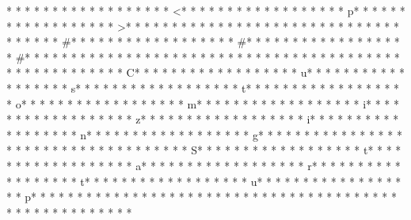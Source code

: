 * * *  * * *  * * *  *  * * *  *  * * *  * <* * *  * * *  * * *  *  * * *  *  * * *  * p* * *  * * *  * * *  *  * * *  *  * * *  * >* * *  * * *  * * *  *  * * *  *  * * *  * 
* * *  * * *  * * *  *  * * *  *  * * *  * #* * *  * * *  * * *  *  * * *  *  * * *  * #* * *  * * *  * * *  *  * * *  *  * * *  * #* * *  * * *  * * *  *  * * *  *  * * *  *  * * *  * * *  * * *  *  * * *  *  * * *  * {* * *  * * *  * * *  *  * * *  *  * * *  * C* * *  * * *  * * *  *  * * *  *  * * *  * u* * *  * * *  * * *  *  * * *  *  * * *  * s* * *  * * *  * * *  *  * * *  *  * * *  * t* * *  * * *  * * *  *  * * *  *  * * *  * o* * *  * * *  * * *  *  * * *  *  * * *  * m* * *  * * *  * * *  *  * * *  *  * * *  * i* * *  * * *  * * *  *  * * *  *  * * *  * z* * *  * * *  * * *  *  * * *  *  * * *  * i* * *  * * *  * * *  *  * * *  *  * * *  * n* * *  * * *  * * *  *  * * *  *  * * *  * g* * *  * * *  * * *  *  * * *  *  * * *  *  * * *  * * *  * * *  *  * * *  *  * * *  * S* * *  * * *  * * *  *  * * *  *  * * *  * t* * *  * * *  * * *  *  * * *  *  * * *  * a* * *  * * *  * * *  *  * * *  *  * * *  * r* * *  * * *  * * *  *  * * *  *  * * *  * t* * *  * * *  * * *  *  * * *  *  * * *  * u* * *  * * *  * * *  *  * * *  *  * * *  * p* * *  * * *  * * *  *  * * *  *  * * *  * }* * *  * * *  * * *  *  * * *  *  * * *  * 
* * *  * * *  * * *  *  * * *  *  * * *  * 
